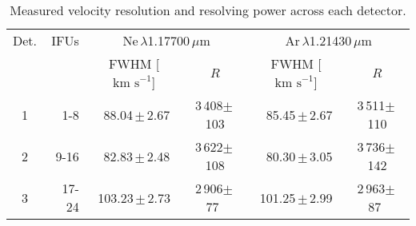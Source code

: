 \documentclass[iop]{emulateapj}
\def\lam{$\lambda$}
\def\kms{$\mbox{km s}^{-1}$}
\def\a{$\phantom{^\ast}$}
\def\o{$\phantom{0}$}
\begin{document}
\begin{table*}
\caption{Measured velocity resolution and resolving power across each detector.\label{tb:res}}
\scriptsize
\begin{center}
\begin{tabular}{crcccc}
\hline
\hline
Det. & IFUs & \multicolumn{2}{c}{Ne\,\lam1.17700\,$\mu$m}
            & \multicolumn{2}{c}{Ar\,\lam1.21430\,$\mu$m} \\
 & & FWHM [\kms] & $R$ & FWHM [\kms] & $R$ \\
  \hline
1 & 1-8 &  \a88.04\,$\pm$\,2.67 & 3\,408$\pm$\,103 &
           \o85.45\,$\pm$\,2.67 & 3\,511$\pm$\,110 \\
2 & 9-16 & \a82.83\,$\pm$\,2.48 & 3\,622$\pm$\,108 &
           \o80.30\,$\pm$\,3.05 & 3\,736$\pm$\,142 \\
3 & 17-24 & 103.23\,$\pm$\,2.73 & 2\,906$\pm$\,77\a &
            101.25\,$\pm$\,2.99 & 2\,963$\pm$\,87\a \\
\hline
\end{tabular}
\end{center}
\end{table*}
\end{document}
